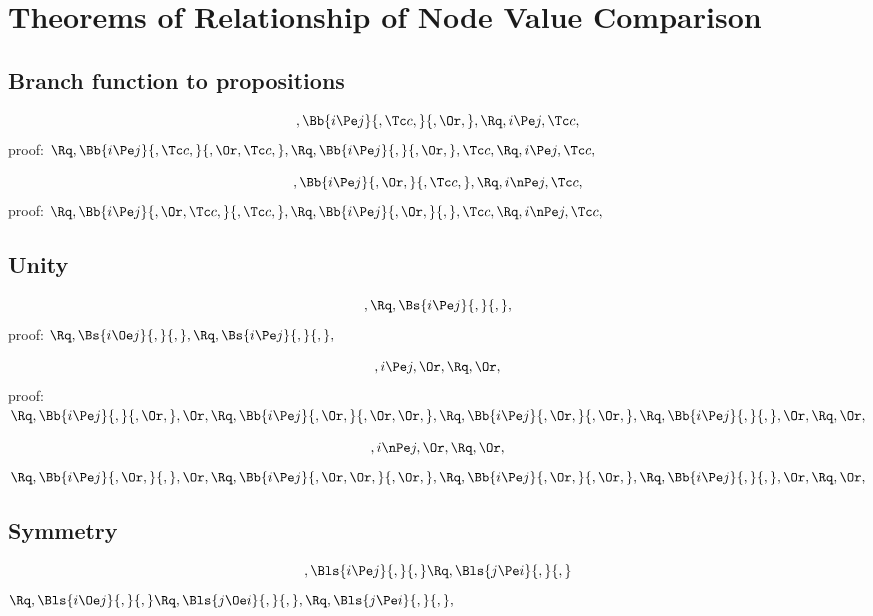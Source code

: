 
 \chapter{Theorems of Relationship of Node Value Comparison}
 \section{Branch function to propositions}
 \[, \Bb{i  \Pe j}{, \Tc c,}{, \Or,},  \Rq ,i  \Pe j,  \Tc c, \]
 proof:
 \begin{math}
    \Rq, \Bb{i  \Pe j}{, \Tc c,}{, \Or, \Tc c,},
    \Rq, \Bb{i  \Pe j}{,}{, \Or,}, \Tc c,
    \Rq, i  \Pe j, \Tc c,
 \end{math}

 \[, \Bb{i  \Pe j}{, \Or,}{, \Tc c,},  \Rq ,i  \nPe j,  \Tc c, \]
 proof:
 \begin{math}
    \Rq, \Bb{i  \Pe j}{, \Or,  \Tc c,}{, \Tc c,},
    \Rq, \Bb{i  \Pe j}{, \Or,}{,}, \Tc c,
    \Rq, i  \nPe j,  \Tc c,
 \end{math}

 \section{Unity}
 \[,  \Rq ,  \Bs{i  \Pe j}{,}{,}, \]
 proof:
 \begin{math}
    \Rq , \Bs{i  \Oe j}{,}{,}, 
    \Rq , \Bs{i  \Pe j}{,}{,},
 \end{math}

 \[, i  \Pe j,  \Or,  \Rq ,  \Or, \]
proof:  \\
\begin{math} 
 \Rq, \Bb{i  \Pe j}{,}{, \Or,},  \Or, 
 \Rq, \Bb{i  \Pe j}{,\Or, }{, \Or,\Or, }, 
 \Rq, \Bb{i  \Pe j}{,\Or,}{,\Or,},
 \Rq, \Bb{i  \Pe j}{,}{,},\Or,
 \Rq, \Or,
\end{math}


 \[, i  \nPe j,  \Or,  \Rq ,  \Or, \]
 \begin{math} 
   \Rq, \Bb{i  \Pe j}{, \Or,}{,},  \Or, 
   \Rq, \Bb{i  \Pe j}{, \Or, \Or,}{, \Or,},  
   \Rq, \Bb{i  \Pe j}{,\Or,}{,\Or,},
   \Rq, \Bb{i  \Pe j}{,}{,}, \Or,
   \Rq, \Or,
\end{math}

 \section{Symmetry}
 \[,  \Bls{i \Pe j}{,}{,}  \Rq ,  \Bls{j  \Pe i}{,}{,}  \]
 \begin{math} 
   \Rq, \Bls{i \Oe j}{,}{,} 
   \Rq, \Bls{j  \Oe i}{,}{,},
   \Rq, \Bls{j  \Pe i}{,}{,},
\end{math}

